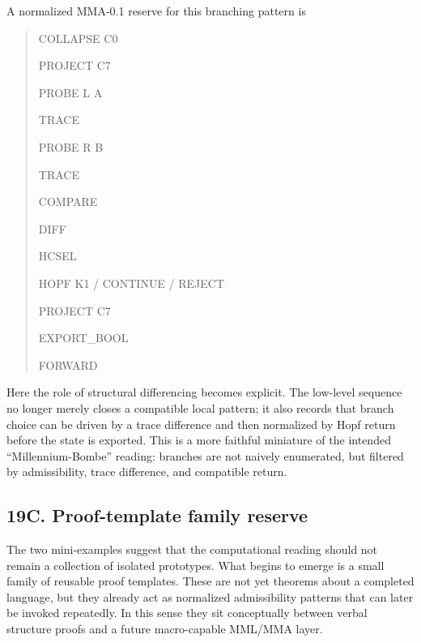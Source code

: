 A normalized MMA-0.1 reserve for this branching pattern is
\begin{quote}
\ttfamily
COLLAPSE C0 \par
PROJECT C7 \par
PROBE L A \par
TRACE \par
PROBE R B \par
TRACE \par
COMPARE \par
DIFF \par
HCSEL \par
HOPF K1 / CONTINUE / REJECT \par
PROJECT C7 \par
EXPORT\_BOOL \par
FORWARD
\end{quote}
Here the role of structural differencing becomes explicit. The low-level sequence no longer merely closes a compatible local pattern; it also records that branch choice can be driven by a trace difference and then normalized by Hopf return before the state is exported. This is a more faithful miniature of the intended ``Millennium-Bombe'' reading: branches are not naively enumerated, but filtered by admissibility, trace difference, and compatible return.



\subsection*{19C. Proof-template family reserve}
The two mini-examples suggest that the computational reading should not remain a collection of isolated prototypes. What begins to emerge is a small family of reusable proof templates. These are not yet theorems about a completed language, but they already act as normalized admissibility patterns that can later be invoked repeatedly. In this sense they sit conceptually between verbal structure proofs and a future macro-capable MML/MMA layer.

